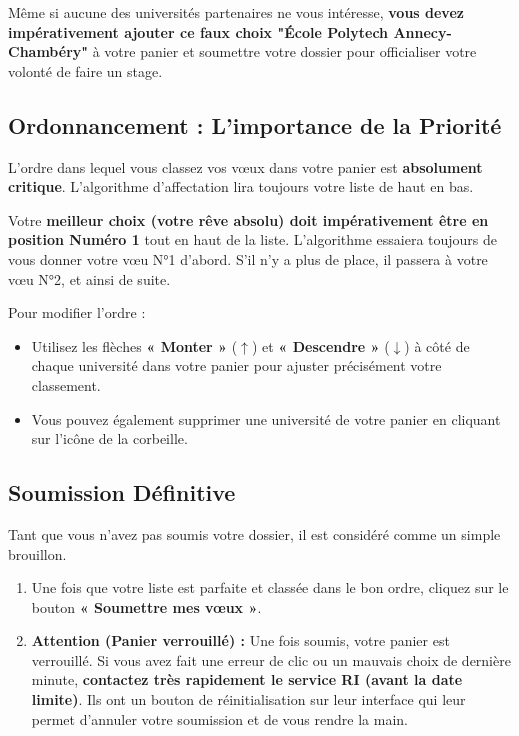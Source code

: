 \documentclass[12pt,a4paper]{article}
\begin{document}
\begin{tcolorbox}[colback=red!5!white,colframe=red!75!black,title=⚠️ OBLIGATION DE SOUMISSION]
Même si aucune des universités partenaires ne vous intéresse, \textbf{vous devez impérativement ajouter ce faux choix "École Polytech Annecy-Chambéry"} à votre panier et soumettre votre dossier pour officialiser votre volonté de faire un stage.
\end{tcolorbox}

\subsection{Ordonnancement : L'importance de la Priorité}
L'ordre dans lequel vous classez vos vœux dans votre panier est \textbf{absolument critique}. L'algorithme d'affectation lira toujours votre liste de haut en bas. 

\begin{tcolorbox}[colback=red!5!white,colframe=red!75!black,title=⚠️ STRATÉGIE DE CLASSEMENT]
Votre \textbf{meilleur choix (votre rêve absolu) doit impérativement être en position Numéro 1} tout en haut de la liste.
\newline \newline L'algorithme essaiera toujours de vous donner votre vœu N°1 d'abord. S'il n'y a plus de place, il passera à votre vœu N°2, et ainsi de suite.
\end{tcolorbox}

Pour modifier l'ordre :
\begin{itemize}
    \item Utilisez les flèches \textbf{« Monter »} ($\uparrow$) et \textbf{« Descendre »} ($\downarrow$) à côté de chaque université dans votre panier pour ajuster précisément votre classement.
    \item Vous pouvez également supprimer une université de votre panier en cliquant sur l'icône de la corbeille.
\end{itemize}

\subsection{Soumission Définitive}
Tant que vous n'avez pas soumis votre dossier, il est considéré comme un simple brouillon.
\begin{enumerate}
    \item Une fois que votre liste est parfaite et classée dans le bon ordre, cliquez sur le bouton \textbf{« Soumettre mes vœux »}.
    \item \textbf{Attention (Panier verrouillé) :} Une fois soumis, votre panier est verrouillé. Si vous avez fait une erreur de clic ou un mauvais choix de dernière minute, \textbf{contactez très rapidement le service RI (avant la date limite)}. Ils ont un bouton de réinitialisation sur leur interface qui leur permet d'annuler votre soumission et de vous rendre la main.
\end{enumerate}
\end{document}
